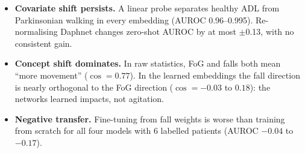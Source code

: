 \begin{itemize}
  \item \textbf{Covariate shift persists.} A linear probe separates healthy ADL from Parkinsonian walking in every
        embedding (AUROC 0.96--0.995). Re-normalising Daphnet changes zero-shot AUROC by at most
        $\pm$0.13, with no consistent gain.
  \item \textbf{Concept shift dominates.} In raw statistics, FoG and falls both mean ``more movement''
        ($\cos = 0.77$). In the learned embeddings the fall direction is nearly orthogonal to the FoG
        direction ($\cos = -0.03$ to $0.18$): the networks learned impacts, not agitation.
  \item \textbf{Negative transfer.} Fine-tuning from fall weights is worse than training from scratch
        for all four models with 6 labelled patients (AUROC $-0.04$ to $-0.17$).
\end{itemize}
